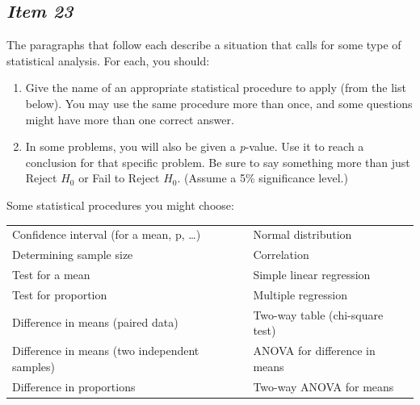 \documentclass[twoside,openany]{tufte-book}
\begin{document}
\subsection{\textbf{\textit{Item 23}}}
The paragraphs that follow each describe a situation that calls for some type of statistical analysis.  For each, you should:
\renewcommand{\labelenumi}{\arabic{enumi}.}
\begin{enumerate}[leftmargin=1cm, itemsep=.2em]
\item Give the name of an appropriate statistical procedure to apply (from the list below). You may use the same procedure more than once, and some questions might have more than one correct answer.
\item In some problems, you will also be given a \textit{p}-value. Use it to reach a conclusion for that specific problem.  Be sure to say something more than just Reject $H_0$ or Fail to Reject $H_0$. (Assume a 5\% significance level.) 
\end{enumerate}

Some statistical procedures you might choose:
\begin{table}[!ht]
\begin{center}
\begin{tabular}{ll}
\hline
Confidence interval (for a mean, p, \ldots) & Normal distribution\\
Determining sample size	& Correlation\\
Test for a mean	 & Simple linear regression\\
Test for proportion & Multiple regression\\
Difference in means (paired data) & Two-way table (chi-square test)\\
Difference in means (two independent samples) & ANOVA for difference in means\\
Difference in proportions & Two-way ANOVA for means\\
\hline
\end{tabular}
\end{center}
\end{table}

\renewcommand{\labelenumi}{\Alph{enumi}.}
\end{document}
